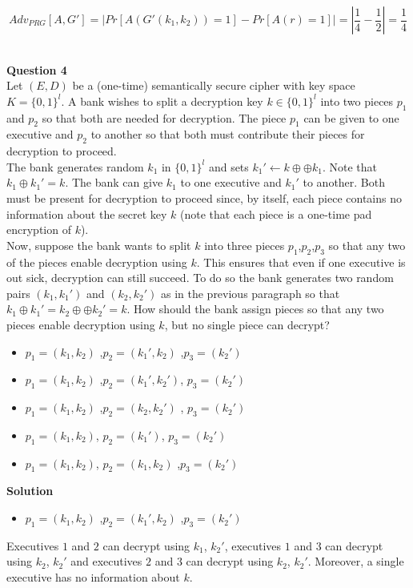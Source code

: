 \documentclass[a4paper,12pt]{article}
\begin{document}
\begin{equation*}
Adv_{PRG}[A,G'] = |Pr[A(G'(k_{1},k_{2}))=1] - Pr[A(r)=1]| = |\frac{1}{4}-\frac{1}{2}| = \frac{1}{4}
\end{equation*}

\ \\
\textbf{Question 4} \\

Let $(E,D)$ be a (one-time) semantically secure cipher with key space $K=\{0,1\}^{l}$. A bank wishes to split a decryption key $k\in\{0,1\}^{l}$ into two pieces $p_1$ and $p_2$ so that both are needed for decryption. The piece $p_1$ can be given to one executive and $p_2$ to another so that both must contribute their pieces for decryption to proceed.\\

The bank generates random $k_{1}$ in $\{0,1\}^{l}$ and sets $k_{1}'\leftarrow k\oplus ⊕k_{1}$. Note that $k_{1}\oplus k_{1}'=k$. The bank can give $k_1$ to one executive and $k_{1}'$ to another. Both must be present for decryption to proceed since, by itself, each piece contains no information about the secret key $k$ (note that each piece is a one-time pad encryption of $k$).\\

Now, suppose the bank wants to split $k$ into three pieces $p_{1}$,$p_{2}$,$p_{3}$ so that any two of the pieces enable decryption using $k$. This ensures that even if one executive is out sick, decryption can still succeed. To do so the bank generates two random pairs $(k_{1},k_{1}')$ and $(k_2,k_{2}')$ as in the previous paragraph so that $k_{1}\oplus k_{1}'=k_{2}\oplus ⊕k_{2}'=k$. How should the bank assign pieces so that any two pieces enable decryption using $k$, but no single piece can decrypt?
%
\begin{itemize}
\item $p_{1}=(k_{1},k_{2})$ ,$p_{2}=(k_{1}',k_{2})$ ,$p_{3}=(k_{2}')$
\item $p_{1}=(k_{1},k_{2})$ ,$p_{2}=(k_{1}',k_{2}')$, $p_{3}=(k_{2}')$
\item $p_{1}=(k_{1},k_{2})$ ,$p_{2}=(k_{2},k_{2}')$ , $p_{3}=(k_{2}')$
\item $p_{1}=(k_{1},k_{2})$, $p_{2}=(k_{1}')$, $p_{3}=(k_{2}')$
\item $p_{1}=(k_{1},k_{2})$, $p_{2}=(k_{1},k_{2})$ ,$p_{3}=(k_{2}')$
\end{itemize}

\textbf{Solution}
%
\begin{itemize}
\item $p_{1}=(k_{1},k_{2})$ ,$p_{2}=(k_{1}',k_{2})$ ,$p_{3}=(k_{2}')$
\end{itemize}
%
Executives $1$ and $2$ can decrypt using $k_{1}$, $k_{2}'$, executives $1$ and $3$ can decrypt using $k_{2}$, $k_{2}'$ and executives $2$ and $3$ can decrypt using $k_{2}$, $k_{2}'$. Moreover, a single executive has no information about $k$.\\
\end{document}
